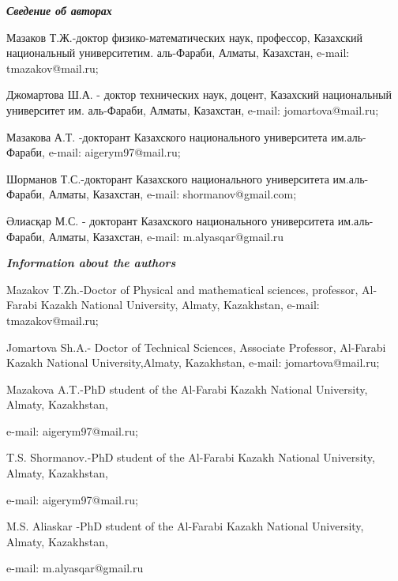 \emph{{\bfseries Сведение об авторах}}

\begin{noparindent}
Мазаков Т.Ж.-доктор физико-математических наук, профессор, Казахский
национальный университетим. аль-Фараби, Алматы, Казахстан, e-mail:
tmazakov@mail.ru;

Джомартова Ш.А. - доктор технических наук, доцент, Казахский
национальный университет им. аль-Фараби, Алматы, Казахстан, e-mail:
jomartova@mail.ru;

Мазакова А.Т. -докторант Казахского национального университета
им.аль-Фараби, e-mail: aigerym97@mail.ru;

Шорманов Т.С.-докторант Казахского национального университета
им.аль-Фараби, Алматы, Казахстан, e-mail: shormanov@gmail.com;

Әлиасқар М.С. - докторант Казахского национального университета
им.аль-Фараби, Алматы, Казахстан, e-mail: m.alyasqar@gmail.ru
\end{noparindent}

\emph{{\bfseries Information about the authors}}

\begin{noparindent}
Mazakov T.Zh.-Doctor of Physical and mathematical sciences, professor,
Al-Farabi Kazakh National University, Almaty, Kazakhstan, e-mail:
tmazakov@mail.ru;

Jomartova Sh.A.- Doctor of Technical Sciences, Associate Professor,
Al-Farabi Kazakh National University,Almaty, Kazakhstan, e-mail:
jomartova@mail.ru;

Mazakova A.T.-PhD student of the Al-Farabi Kazakh National University,
Almaty, Kazakhstan,

e-mail: aigerym97@mail.ru;

T.S. Shormanov.-PhD student of the Al-Farabi Kazakh National University,
Almaty, Kazakhstan,

e-mail: aigerym97@mail.ru;

M.S. Aliaskar -PhD student of the Al-Farabi Kazakh National University,
Almaty, Kazakhstan,

e-mail: m.alyasqar@gmail.ru
\end{noparindent}
